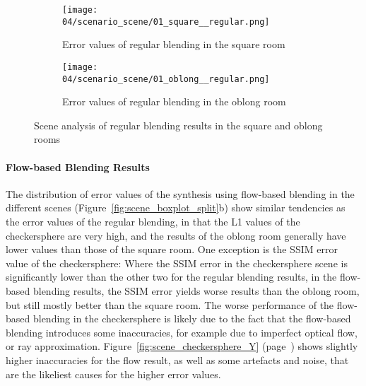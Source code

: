 \begin{figure}
\centering
    \hfill
    \begin{subfigure}[b]{0.4\textwidth}
            \centering
            \texttt{[image: 04/scenario\_scene/01\_square\_\_regular.png]}
            \caption{Error values of regular blending in the square room}
    \end{subfigure}
    \hfill
    \begin{subfigure}[b]{0.4\textwidth}
            \centering
            \texttt{[image: 04/scenario\_scene/01\_oblong\_\_regular.png]}
            \caption{Error values of regular blending in the oblong room}
    \end{subfigure}
    \hfill
  \caption{Scene analysis of regular blending results in the square and oblong rooms} \label{fig:scene_regular_square_oblong}
\end{figure}

\paragraph{Flow-based Blending Results}
The distribution of error values of the synthesis using flow-based blending in the different scenes (Figure~\ref{fig:scene_boxplot_split}b) show similar tendencies as the error values of the regular blending, in that the L1 values of the checkersphere are very high, and the results of the oblong room generally have lower values than those of the square room. One exception is the SSIM error value of the checkersphere: Where the SSIM error in the checkersphere scene is significantly lower than the other two for the regular blending results, in the flow-based blending results, the SSIM error yields worse results than the oblong room, but still mostly better than the square room. The worse performance of the flow-based blending in the checkersphere is likely due to the fact that the flow-based blending introduces some inaccuracies, for example due to imperfect optical flow, or ray approximation. Figure~\ref{fig:scene_checkersphere_Y} (page~\pageref{fig:scene_checkersphere_Y}) shows slightly higher inaccuracies for the flow result, as well as some artefacts and noise, that are the likeliest causes for the higher error values.

